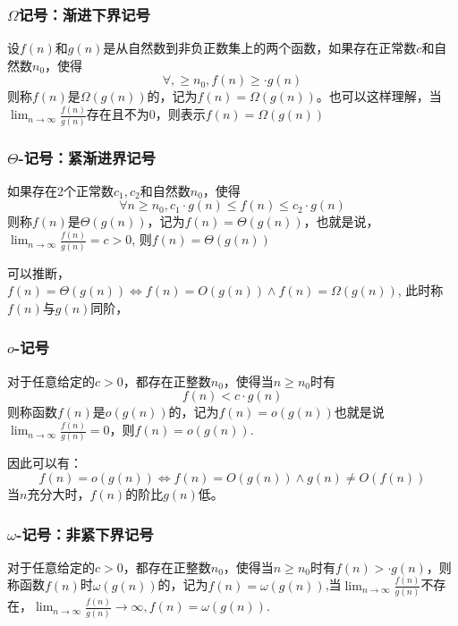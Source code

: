\documentclass[./../main.tex]{subfiles} %
\begin{document}
\subsubsection{$\Omega$记号：渐进下界记号}

设$f(n)$和$g(n)$是从自然数到非负正数集上的两个函数，如果存在正常数$c$和自然数$n_0$，使得
$$
\forall ,\ge n_0, f(n)\ge \cdot g(n)
$$
则称$f(n)$是$\Omega(g(n))$的，记为$f(n)=\Omega(g(n))$。也可以这样理解，当$\lim_{n\to \infty}\frac{f(n)}{g(n)}$存在且不为0，则表示$f(n)=\Omega(g(n))$


\subsubsection{$\Theta$-记号：紧渐进界记号}
如果存在2个正常数$c_1,c_2$和自然数$n_0$，使得
$$
\forall n \ge n_0, c_1\cdot g(n)\le f(n)\le c_2\cdot g(n)
$$
则称$f(n)$是$\Theta(g(n))$，记为$f(n)=\Theta(g(n))$，也就是说，$\lim_{n\to\infty}\frac{f(n)}{g(n)}=c>0$, 则$f(n)=\Theta(g(n))$

可以推断，$f(n)=\Theta(g(n))\iff f(n)=O(g(n))\land f(n)=\Omega(g(n))$, 此时称$f(n)$与$g(n)$同阶，

\subsubsection{$o$-记号}
对于任意给定的$c>0$，都存在正整数$n_0$，使得当$n\ge n_0$时有
$$
f(n)<c\cdot g(n)
$$
则称函数$f(n)$是$o(g(n))$的，记为$f(n)=o(g(n))$也就是说$\lim_{n\to\infty}\frac{f(n)}{g(n)}=0$，则$f(n)=o(g(n))$.

因此可以有：
$$
f(n)=o(g(n))\iff f(n)=O(g(n))\land g(n)\neq O(f(n))
$$
当$n$充分大时，$f(n)$的阶比$g(n)$低。

\subsubsection{$\omega$-记号：非紧下界记号}
对于任意给定的$c>0$，都存在正整数$n_0$，使得当$n\ge n_0$时有$f(n)>\cdot g(n)$，则称函数$f(n)$时$\omega(g(n))$的，记为$f(n)=\omega(g(n))$,当$\lim_{n\to\infty}\frac{f(n)}{g(n)}$不存在，$\lim_{n\to\infty}\frac{f(n)}{g(n)}\to\infty, f(n)=\omega(g(n))$.
\end{document}
